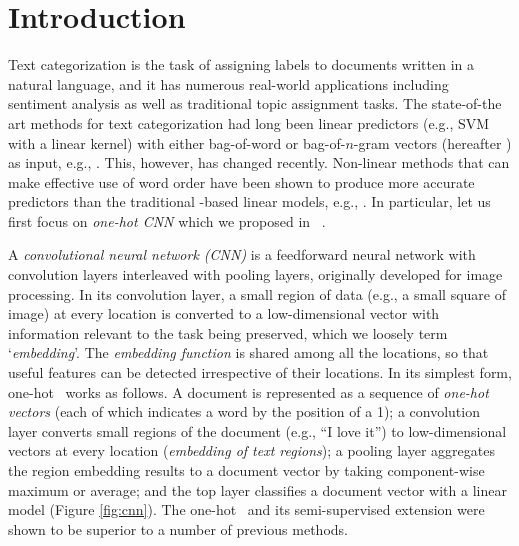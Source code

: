 \documentclass{article}
\begin{document}
\section{Introduction} 
\label{sec:intro}

Text categorization is the task of assigning labels to documents written in 
a natural language, and it has numerous real-world applications including sentiment analysis 
as well as traditional topic assignment tasks.  
The state-of-the art methods for text categorization had long been linear predictors 
(e.g., SVM with a linear kernel) with either bag-of-word or bag-of-$n$-gram vectors 
(hereafter {\em \bow}) as input, 
e.g., \cite{J98,LYRL04}. 
This, however, has changed recently.  
Non-linear methods that can make effective use of word order 
have been shown to produce more accurate predictors than the traditional \bow-based linear models, e.g., 
\cite{DL15,ZZC15}.  
In particular, let us first focus on {\em one-hot CNN} which we proposed in \JZab\ \cite{JZ15a,JZ15b}.

A {\em convolutional neural network (CNN)} 
\cite{LeCun+etal98} is a feedforward neural network with convolution layers interleaved with pooling layers, 
originally developed for image processing.  
In its convolution layer, a small region of data (e.g., a small square of image) at every location 
is converted to a low-dimensional vector with information relevant to the task being preserved, 
which we loosely term `{\em embedding}'.  
The {\em embedding function} is shared among all the locations, 
so that useful features can be detected irrespective of their locations.  
In its simplest form, one-hot \cnn\ works as follows. 
A document is represented as a sequence of {\em one-hot vectors} 
(each of which indicates a word by the position of a 1); 
a convolution layer converts small regions of the document (e.g., ``I love it'') to low-dimensional vectors at every location 
({\em embedding of text regions}); 
a pooling layer aggregates the region embedding results to a document vector
by taking component-wise maximum or average; and 
the top layer classifies a document vector with a linear model (Figure \ref{fig:cnn}). 
The one-hot \cnn\ and its semi-supervised extension were shown to be
superior to a number of previous methods. 
\end{document}
